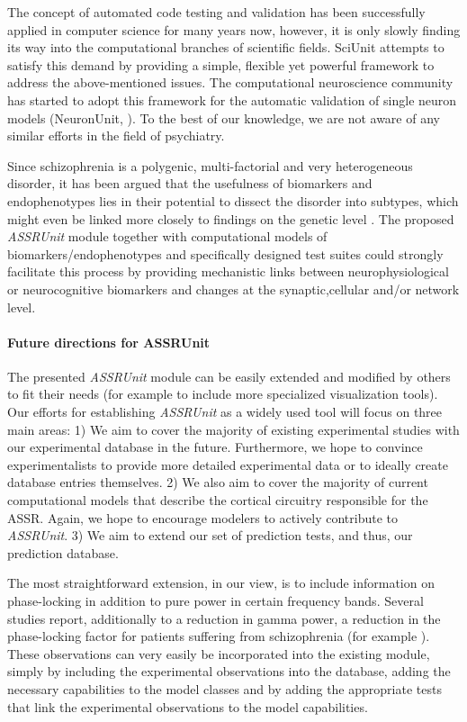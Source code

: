 \documentclass[CompPsych]{stjour}
\begin{document}
The concept of automated code testing and validation has been successfully applied in computer science for many years now, however, it is only slowly finding its way into the computational 
branches of scientific fields. SciUnit attempts to satisfy this demand by providing a simple, flexible yet powerful framework to address the above-mentioned issues. The computational neuroscience 
community has started to adopt this framework for the automatic validation of single neuron models (NeuronUnit, \cite{Gerkin2014}). 
To the best of our knowledge, we are not aware of any similar efforts in the field of psychiatry.

Since schizophrenia is a polygenic, multi-factorial and very heterogeneous disorder, it has been argued that the usefulness of biomarkers and endophenotypes lies in their potential to
dissect the disorder into subtypes, which might even be linked more closely to findings on the genetic level \cite{Meyer2006,Perlis2011,Markou2009}. The proposed \textit{ASSRUnit} module together with computational models of 
biomarkers/endophenotypes and specifically designed test suites could strongly facilitate this process by providing mechanistic links between neurophysiological or neurocognitive biomarkers
and changes at the synaptic,cellular and/or network level.


\paragraph{Future directions for ASSRUnit}
The presented \textit{ASSRUnit} module can be easily extended and modified by others to fit their needs (for example to include more specialized visualization tools). Our efforts
for establishing \textit{ASSRUnit} as a widely used tool will focus on three main areas: 1) We aim to cover the majority of existing experimental studies with our experimental database in the future.
Furthermore, we hope to convince experimentalists to provide more detailed experimental data or to
ideally create database entries themselves. 2) We also aim to cover the majority of current computational models that describe the cortical circuitry responsible for the ASSR. 
Again, we hope to encourage modelers to actively contribute to \textit{ASSRUnit}.
3) We aim to extend our set of prediction tests, and thus, our prediction database. 

The most straightforward extension, in our view, is to include information on phase-locking in addition to 
pure power in certain frequency bands. 
Several studies report, additionally to a reduction in gamma power, a  reduction in the phase-locking factor for patients suffering from schizophrenia 
(for example \cite{Kwon1999,Brenner2003,Light2006,Vierling2008,Krishnan2009}). These observations can very easily be incorporated into the existing module, simply by including the experimental observations into the database,
adding the necessary capabilities to the model classes and by adding the appropriate tests that link the experimental observations to the model capabilities.
\end{document}
